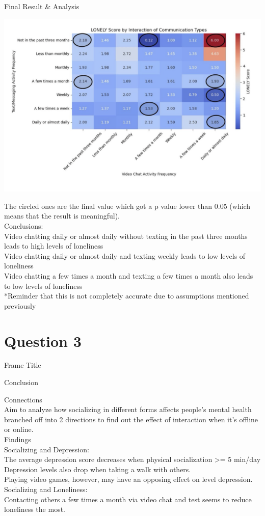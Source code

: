 \documentclass{beamer}
\begin{document}
\begin{frame}{Final Result & Analysis}

\includegraphics[width=0.5\linewidth]{presentation/Screenshot 2024-11-28 at 12.02.27 PM.png}

The circled ones are the final value which got a p value lower than 0.05 (which means that the result is meaningful).\\

Conclusions:\\
Video chatting daily or almost daily without texting in the past three months leads to high levels of loneliness\\
Video chatting daily or almost daily and texting weekly leads to low levels of loneliness\\
Video chatting a few times a month and texting a few times a month also leads to low levels of loneliness\\

*Reminder that this is not completely accurate due to assumptions mentioned previously\\
\end{frame}

\section{Question 3}
\begin{frame}{Frame Title}
    
\end{frame}

\begin{frame}{Conclusion}

Connections\\
Aim to analyze how socializing in different forms affects people’s mental health\\
branched off into 2 directions to find out the effect of  interaction when it's offline or online.\\

Findings\\ 
Socializing and Depression:\\
The average depression score decreases when physical socialization >= 5 min/day\\
Depression levels also drop when taking a walk with others.\\
Playing video games, however, may have an opposing effect on level depression.\\
Socializing and Loneliness:\\
Contacting others a few times a month via video chat and test seems to reduce loneliness the most.\\

    
\end{frame}
\end{document}
